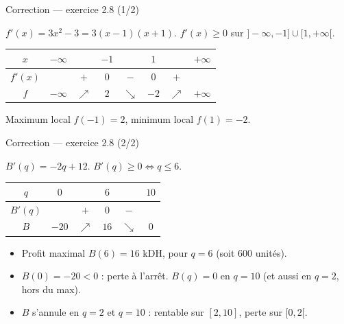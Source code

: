 \documentclass[aspectratio=169,11pt]{beamer}
\begin{document}
\begin{frame}{Correction --- exercice 2.8 (1/2)}
	\begin{definitionbox}[Correction de $f$]
		$f'(x)=3x^2-3=3(x-1)(x+1)$.
		$f'(x)\ge 0$ sur $]-\infty,-1]\cup[1,+\infty[$.
		\vspace{0.15cm}
		\centering
		\renewcommand{\arraystretch}{1.2}
		\begin{tabular}{|c|ccccccc|}
			\hline
			$x$ & $-\infty$ && $-1$ && $1$ && $+\infty$ \\
			\hline
			$f'(x)$ && $+$ & $0$ & $-$ & $0$ & $+$ & \\
			\hline
			$f$ & $-\infty$ & $\nearrow$ & $2$ & $\searrow$ & $-2$ & $\nearrow$ & $+\infty$ \\
			\hline
		\end{tabular}
		\vspace{0.15cm}
		\par Maximum local $f(-1)=2$, minimum local $f(1)=-2$.
	\end{definitionbox}
\end{frame}

\begin{frame}{Correction --- exercice 2.8 (2/2)}
	\begin{definitionbox}
		$B'(q)=-2q+12$. $B'(q)\ge 0\iff q\le 6$.
		\vspace{0.1cm}
		\centering
		\renewcommand{\arraystretch}{1.2}
		\begin{tabular}{|c|ccccc|}
			\hline
			$q$ & $0$ && $6$ && $10$ \\
			\hline
			$B'(q)$ && $+$ & $0$ & $-$ & \\
			\hline
			$B$ & $-20$ & $\nearrow$ & $16$ & $\searrow$ & $0$ \\
			\hline
		\end{tabular}
		\vspace{0.15cm}
		\begin{itemize}
			\item Profit maximal $B(6)=16$ kDH, pour $q=6$ (soit $600$ unités).
			\item $B(0)=-20<0$ : perte à l'arrêt. $B(q)=0$ en $q=10$
			(et aussi en $q=2$, hors du max).
			\item $B$ s'annule en $q=2$ et $q=10$ : rentable sur $[2,10]$,
			perte sur $[0,2[$.
		\end{itemize}
	\end{definitionbox}
\end{frame}

\end{document}
